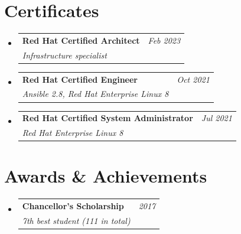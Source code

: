 \documentclass[letterpaper,11pt]{article}
\makeatletter
\newcommand{\resumeOrganizationHeading}[4]{
 \vspace{-2pt}\item
 \begin{tabular*}{0.97\textwidth}[t]{l@{\extracolsep{\fill}}r}
 \textbf{#1} & \textit{\small #2} \\
 \textit{\small#3}
 \end{tabular*}\vspace{-7pt}
}
\newcommand{\resumeSubHeadingListStart}{\begin{itemize}[leftmargin=0.15in, label={}]}
\newcommand{\resumeSubHeadingListEnd}{\end{itemize}}
\makeatother
\begin{document}
\section{Certificates}
 \resumeSubHeadingListStart
 \resumeOrganizationHeading{Red Hat Certified Architect}{Feb 2023}{Infrastructure specialist}{}
 \resumeOrganizationHeading{Red Hat Certified Engineer}{Oct 2021}{Ansible 2.8, Red Hat Enterprise Linux 8}{}
 \resumeOrganizationHeading{Red Hat Certified System Administrator}{Jul 2021}{Red Hat Enterprise Linux 8}{}
 \resumeSubHeadingListEnd


\section{Awards \& Achievements}
 \vspace{2pt}
 \resumeSubHeadingListStart
 \resumeOrganizationHeading{Chancellor’s Scholarship}{2017}{7th best student (111 in total)}{}
 \resumeSubHeadingListEnd

\end{document}
